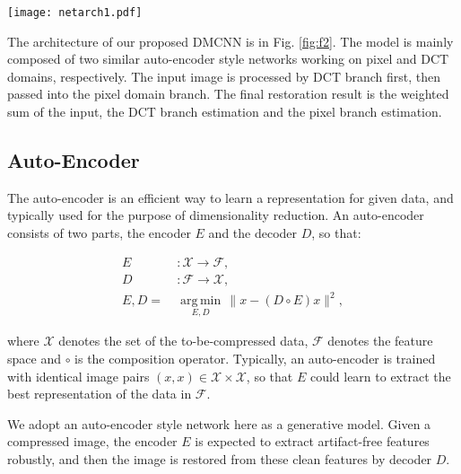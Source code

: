 \documentclass{article}
\begin{document}
\begin{figure*}[htb]
  \vspace{-0.6cm}
  \begin{minipage}[b]{1.0\linewidth}
    \centering
    \centerline{\texttt{[image: netarch1.pdf]}}
    \vspace{-0.2cm}
    \caption{The architecture of Dual-domain Multi-scale
    Convolutional Network (DMCNN).}\medskip
    \label{fig:f2}
  \end{minipage}
  \vspace{-1.0cm}
\end{figure*}

The architecture of our proposed DMCNN is in Fig. \ref{fig:f2}.
The model is mainly composed of two similar auto-encoder style networks
working on pixel and DCT domains, respectively. The input image is processed
by DCT branch first, then passed into the pixel domain branch. The final
restoration result is the weighted sum of the input, the DCT branch estimation
and the pixel branch estimation.
\vspace{-0.2cm}

\subsection{Auto-Encoder}
\label{ssec:ae}

The auto-encoder is an efficient way to learn a representation for given data,
and typically used for the purpose of dimensionality reduction.
An auto-encoder consists of two parts, the encoder $E$ and
the decoder $D$, so that:

\begin{equation}
  \begin{aligned}
    E&:\mathcal{X} \rightarrow \mathcal{F}, \\
    D&:\mathcal{F} \rightarrow \mathcal{X}, \\
    \displaystyle E,D =\ &
    {\underset{E,D}
    {\operatorname {arg\,min} }}\,\|x-(D \circ E )x\|^{2},
  \end{aligned}
\end{equation}

where $\mathcal{X}$ denotes the set of the to-be-compressed data, $\mathcal{F}$
denotes the feature space and $\circ$ is the composition operator.
Typically, an auto-encoder is trained with identical
image pairs $(x, x)\in \mathcal{X}\times\mathcal{X}$, so that $E$ could learn to extract the best
representation of the data in $\mathcal{F}$.

We adopt an auto-encoder style network here as a generative model. Given
a compressed image, the encoder $E$ is expected to extract
artifact-free features robustly, and then the image is restored from these
clean features by decoder $D$.
\end{document}
